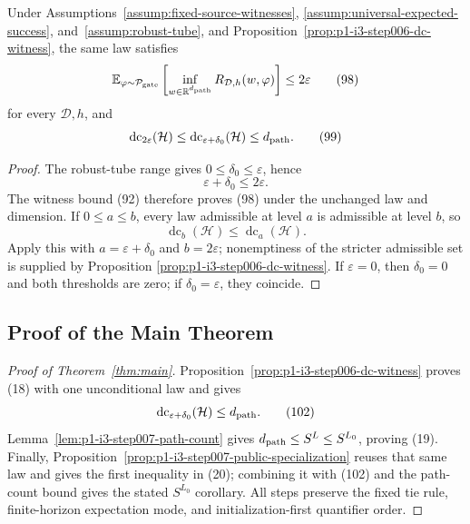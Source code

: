 \begin{proposition}
\label{prop:p1-i3-step007-public-specialization}
Under Assumptions~\ref{assump:fixed-source-witnesses},
\ref{assump:universal-expected-success}, and~\ref{assump:robust-tube}, and
Proposition~\ref{prop:p1-i3-step006-dc-witness}, the same law satisfies
\[
\mathbb E_{\varphi\sim\mathcal P_{\rm gate}}
\left[\inf_{w\in\mathbb R^{d_{\rm path}}}
R_{\mathcal D,h}(w,\varphi)\right]\leq2\varepsilon
\tag{98}
\]
for every $\mathcal D,h$, and
\[
\operatorname{dc}_{2\varepsilon}(\mathcal H)
\leq\operatorname{dc}_{\varepsilon+\delta_0}(\mathcal H)
\leq d_{\rm path}.
\tag{99}
\]
\end{proposition}

\begin{proof}
The robust-tube range gives $0\leq\delta_0\leq\varepsilon$, hence
\[
\varepsilon+\delta_0\leq2\varepsilon.
\tag{100}
\]
The witness bound (92) therefore proves (98) under the unchanged law and
dimension.  If $0\leq a\leq b$, every law admissible at level $a$ is
admissible at level $b$, so
\[
\operatorname{dc}_b(\mathcal H)\leq\operatorname{dc}_a(\mathcal H).
\tag{101}
\]
Apply this with $a=\varepsilon+\delta_0$ and $b=2\varepsilon$; nonemptiness
of the stricter admissible set is supplied by Proposition
\ref{prop:p1-i3-step006-dc-witness}.  If $\varepsilon=0$, then $\delta_0=0$
and both thresholds are zero; if $\delta_0=\varepsilon$, they coincide.
\end{proof}

\subsection{Proof of the Main Theorem}
\label{app:main-proof}

\begin{proof}[Proof of Theorem~\ref{thm:main}]
Proposition~\ref{prop:p1-i3-step006-dc-witness} proves (18) with one
unconditional law and gives
\[
\operatorname{dc}_{\varepsilon+\delta_0}(\mathcal H)
\leq d_{\rm path}.
\tag{102}
\]
Lemma~\ref{lem:p1-i3-step007-path-count} gives
$d_{\rm path}\leq S^L\leq S^{L_0}$, proving (19).  Finally,
Proposition~\ref{prop:p1-i3-step007-public-specialization} reuses that same
law and gives the first inequality in (20); combining it with (102) and the
path-count bound gives the stated $S^{L_0}$ corollary.  All steps preserve the
fixed tie rule, finite-horizon expectation mode, and initialization-first
quantifier order.
\end{proof}
